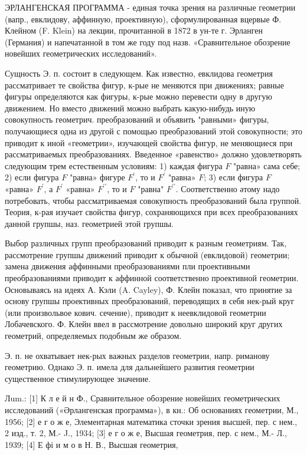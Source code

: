 \documentclass[10pt]{article}
\begin{document}
ЭРЛАНГЕНСКАЯ ПРОГРАММА - единая точка зрения на различные геометрии (вапр., евклидову, аффинную, проективную), сформулированная вцервые Ф. Клейном (F. Klein) на лекции, прочитанной в 1872 в ун-те г. Эрланген (Германия) и напечатанной в том же году под назв. «Сравнительное обозрение новейших геометрических исследований».



Сущность Э. п. состоит в следующем. Как известно, евклидова геометрия рассматривает те свойства фигур, к-рые не меняются при движениях; равные фигуры определяются как фигуры, к-рые можно перевести одну в другую движением. Но вместо движений можно выбрать какую-нибудь иную совокупность геометрич. преобразований и объявить "равными» фигуры, получающиеся одна из другой с помощью преобразований этой совокупности; это приводит к иной «геометрии», изучающей свойства фигур, не меняющиеся при рассматриваемых преобразованиях. Введенное «равенство» должно удовлетворять следующим трем естественным условиям: 1) каждая фигура $F$ "равна» сама себе; 2) если фигура $F$ "равна» фигуре $F^{\prime}$, то и $F^{\prime}$ "равна» $F$; 3) если фигура $F$ «равна» $F^{\prime}$, а $F^{\prime}$ «равна» $F^{\prime \prime}$, то и $F$ "равна" $F^{\prime \prime}$. Соответственно әтому надо потребовать, чтобы рассматриваемая совокупность преобразований была группой. Теория, к-рая изучает свойства фигур, сохраняющихся при всех преобразованиях данной групшы, наз. геометрией этой групшы.



Выбор различных групп преобразований приводит к разным геометриям. Так, рассмотрение групшы движений приводит к обычной (евклидовой) геометрии; замена движения аффинными преобразованиями пли проективными преобразованиями приводит к аффинной соответственно проективной геометрии. Основываясь на идеях А. Кэли (A. Cayley), Ф. Клейн показал, что принятие за основу групшы проективных преобразований, переводящих в себя нек-рый круг (или произвольвое кович. сечение), приводит к неевклидовой геометрии Лобачевского. Ф. Клейн ввел в рассмотрение довольно широкий круг других геометрий, определяемых подобным же образом.



Э. п. не охватывает нек-рых важных разделов геометрии, напр. риманову геометрию. Однако Э. п. имела для дальнейшего развития геометрии существенное стимулирующее значение.



Лum.: [1] К л е й н Ф., Сравнительное обозрение новейших геометрических исследований («Әрлангенская программа»), в кн.: Об основаниях геометрии, М., 1956; [2] е г о ж е, Элементарная математика сточки зрения высшей, пер. с нем., 2 изд., т. 2, М.- J., 1934; [3] е г о ж е, Высшая геометрия, пер. с нем., М.- Л., 1939; [4] Е фі и м о в Н. В., Высшая геометрия,
\end{document}
